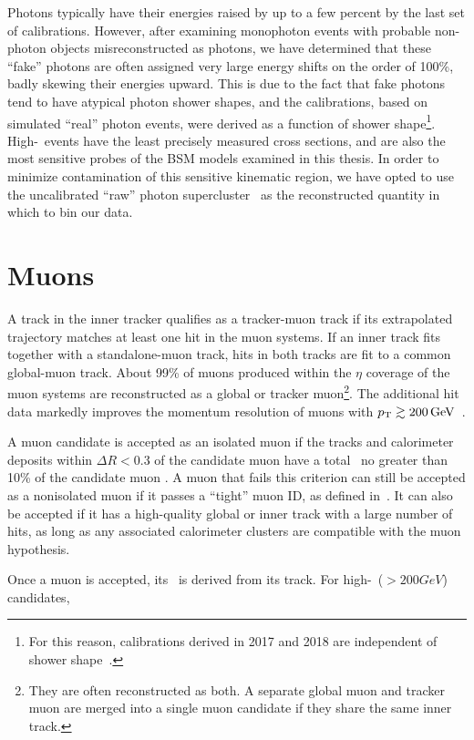 \documentclass[oneside, letterpaper, 12pt, oldfontcommands]{memoir}
\begin{document}
Photons typically have their energies raised by up to a few percent by the last set of calibrations. However, after examining monophoton events with
probable non-photon objects misreconstructed as photons, we have determined that these ``fake'' photons are often assigned very large energy shifts
on the order of 100\%, badly skewing their energies upward. This is due to the fact that fake photons tend to have atypical photon shower shapes,
and the calibrations, based on simulated ``real'' photon events, were derived as a function of shower shape\footnote{For this reason, calibrations
derived in 2017 and 2018 are independent of shower shape~\cite{ref:egammaclusterregression_2018}.}.
High-\ETgamma\ events have the least precisely measured cross sections, and are also the most sensitive probes of the BSM models examined in this thesis.
In order to minimize contamination of this sensitive kinematic region, we have opted to use the uncalibrated ``raw''
photon supercluster \ET\ as the reconstructed quantity in which to bin our data.

\section{Muons} \label{sec:reconstruction_muons}
A track in the inner tracker qualifies as a tracker-muon track if its extrapolated trajectory matches at least one hit in the muon systems.
If an inner track fits together with a standalone-muon track, hits in both tracks are fit to a common global-muon track.
About 99\% of muons produced within the $\eta$ coverage of the muon systems are reconstructed as a global or tracker muon\footnote{They are often reconstructed
as both. A separate global muon and tracker muon are merged into a single muon candidate if they share the same inner track.}.
The additional hit data markedly improves the momentum resolution of muons with $\pT \gtrsim 200\unit{GeV}$~\cite{ref:1748-0221/12/10/P10003}.

A muon candidate is accepted as an isolated muon if the tracks and calorimeter deposits within $\Delta R < 0.3$ of the candidate muon have a total \pT\ no greater than 10\%
of the candidate muon \pT. A muon that fails this criterion can still be accepted as a nonisolated muon if it passes a ``tight'' muon ID, as defined in~\cite{}.
It can also be accepted if it has a high-quality global or inner track with a large number of hits, as long as any associated calorimeter clusters are compatible with the muon hypothesis.

Once a muon is accepted, its \pT\ is derived from its track. For high-\pT\ (${>}200\unit{GeV}$) candidates, 
\end{document}
